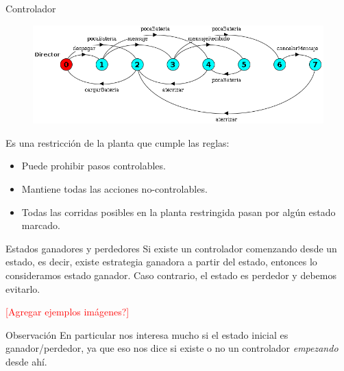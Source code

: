 \begin{frame}{Controlador}
    \begin{figure}
     \includegraphics[width=\textwidth]{figures/director.png}
    \end{figure}

    Es una restricción de la planta que cumple las reglas:

    \begin{itemize}
     \item Puede prohibir pasos controlables.
     \item Mantiene todas las acciones no-controlables.
     \item Todas las corridas posibles en la planta restringida pasan por algún estado marcado.
    \end{itemize}
\end{frame}
\begin{frame}{Estados ganadores y perdedores}
    Si existe un controlador comenzando desde un estado, es decir, existe estrategia ganadora a partir del estado, entonces lo consideramos estado ganador. 
    Caso contrario, el estado es perdedor y debemos evitarlo.
    
    \textcolor{red}{[Agregar ejemplos imágenes?]}
    
    \begin{block}{Observación}
        En particular nos interesa mucho si el estado inicial es ganador/perdedor, ya que eso nos dice si existe o no un controlador \textit{empezando} desde ahí.
    \end{block}

\end{frame}
